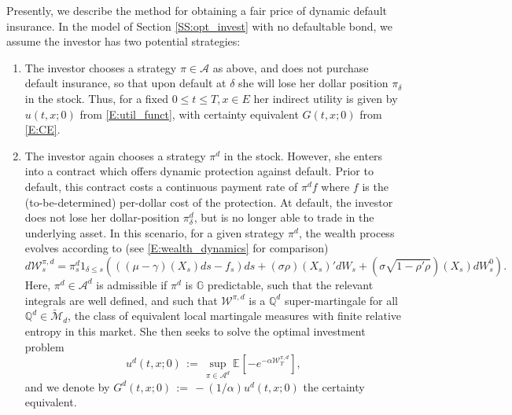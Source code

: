 \documentclass[11pt, letterpaper]{amsart}
\theoremstyle{definition}
\theoremstyle{remark}
\numberwithin{equation}{section}
\newcommand{\We}{\mathcal{W}}
\newcommand{\qprob}{\mathbb{Q}}
\newcommand{\esp}{\mathbb{E}}
\newcommand{\espalt}[2]{\esp^{#1}\bra{#2}}
\newcommand{\tM}{\widetilde{\mathcal{M}}}
\newcommand{\filtg}{\mathbb{G}}
\newcommand{\dfn}{\, := \,}
\newcommand{\bra}[1]{\left[#1\right]}
\begin{document}
Presently, we describe the method for obtaining a fair price of dynamic default insurance.  In the model of Section \ref{SS:opt_invest} with no defaultable bond, we assume the investor has two potential strategies:
\begin{enumerate}[(1)]
\item The investor chooses a strategy $\pi\in\mathcal{A}$ as above, and does not purchase default insurance, so that upon default at $\delta$ she will lose her dollar position $\pi_\delta$ in the stock. Thus, for a fixed $0\leq t\leq T, x\in E$ her indirect utility is given by $u(t,x;0)$ from \eqref{E:util_funct}, with certainty equivalent $G(t,x;0)$ from \eqref{E:CE}.
\item The investor again chooses a strategy $\pi^d$ in the stock. However, she enters into a contract which offers dynamic protection against default.  Prior to default, this contract costs a continuous payment rate of $\pi^d f$ where $f$ is the (to-be-determined) per-dollar cost of the protection.  At default, the investor does not lose her dollar-position $\pi^d_\delta$, but is no longer able to trade in the underlying asset.  In this scenario, for a given strategy $\pi^d$, the wealth process evolves according to (see \eqref{E:wealth_dynamics} for comparison)
    \begin{equation}\label{E:wealth_dynamics_alt}
    d\We^{\pi,d}_{s} = \pi^d_s1_{\delta\leq s}\left(\left((\mu-\gamma)(X_s)ds - f_s\right)ds + (\sigma\rho)(X_s)'dW_s + (\sigma\sqrt{1-\rho'\rho})(X_s)dW^0_s\right).
    \end{equation}
    Here, $\pi^d\in\mathcal{A}^d$ is admissible if $\pi^d$ is $\filtg$ predictable, such that the relevant integrals are well defined, and such that $\We^{\pi,d}$ is a $\qprob^d$ super-martingale for all $\qprob^d\in \tM_d$, the class of equivalent local martingale measures with finite relative entropy in this market.  She then seeks to solve the optimal investment problem
    \begin{equation}\label{E:util_funct_al}
    u^d(t,x;0) \dfn \sup_{\pi\in\mathcal{A}^d}\espalt{}{-e^{-\alpha \We^{\pi,d}_T}},
    \end{equation}
    and we denote by $G^d(t,x;0) \dfn -(1/\alpha)u^d(t,x;0)$ the certainty equivalent.
\end{enumerate}
\end{document}
